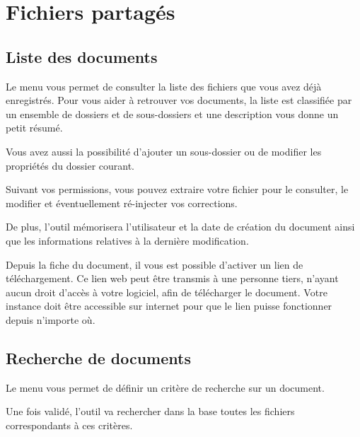 \documentclass[a4paper,10pt,oneside,french]{sphinxmanual}
\begin{document}
\section{Fichiers partagés}
\label{\detokenize{documents/shared_document:fichiers-partages}}\label{\detokenize{documents/shared_document::doc}}

\subsection{Liste des documents}
\label{\detokenize{documents/shared_document:liste-des-documents}}
Le menu  vous permet de consulter la liste des fichiers que vous avez déjà enregistrés. Pour vous aider à retrouver vos documents, la liste est classifiée par un ensemble de dossiers et de sous-dossiers et une description vous donne un petit résumé.

Vous avez aussi la possibilité d’ajouter un sous-dossier ou de modifier les propriétés du dossier courant.

\noindent{}

Suivant vos permissions, vous pouvez extraire votre fichier pour le consulter, le modifier et éventuellement ré-injecter vos corrections.

De plus, l’outil mémorisera l’utilisateur et la date de création du document ainsi que les informations relatives à la dernière modification.

\noindent{}

Depuis la fiche du document, il vous est possible d’activer un lien de téléchargement.
Ce lien web peut être transmis à une personne tiers, n’ayant aucun droit d’accès à votre logiciel, afin de télécharger le document.
 Votre instance doit être accessible sur internet pour que le lien puisse fonctionner depuis n’importe où.


\subsection{Recherche de documents}
\label{\detokenize{documents/shared_document:recherche-de-documents}}
Le menu  vous permet de définir un critère de recherche sur un document.

Une fois validé, l’outil va rechercher dans la base toutes les fichiers correspondants à ces critères.
\end{document}
